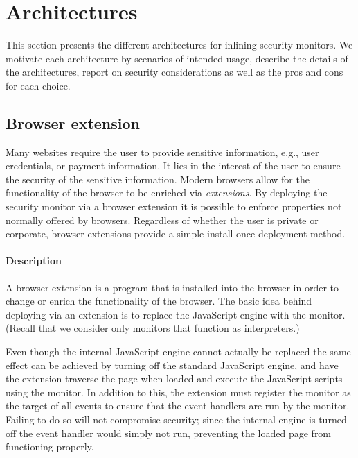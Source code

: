 \documentclass{llncs}
\begin{document}

\section{Architectures}
\label{sec:arch}

This section presents the different architectures for inlining
security monitors. We motivate each architecture by scenarios of
intended usage, describe the details of the architectures, report on
security considerations as well as the pros and cons for each choice.




\subsection{Browser extension}

Many websites require the user to provide sensitive information, e.g., user
credentials, or payment information. It lies in the interest of the user to
ensure the security of the sensitive information.  Modern browsers allow for
the functionality of the browser to be enriched via \emph{extensions}. By
deploying the security monitor via a browser extension it is possible to enforce
properties not normally offered by browsers.  Regardless of whether the user is
private or corporate, browser extensions provide a simple 
install-once deployment method.


\paragraph{Description}

A browser extension is a program that is installed into the browser in order to
change or enrich the functionality of the browser.  The basic idea behind
deploying via an extension is to replace the JavaScript engine with the monitor.
(Recall that we consider only monitors that function as interpreters.)

Even though the internal JavaScript engine cannot actually be replaced the same
effect can be achieved by turning off the standard JavaScript engine, and have
the extension traverse the page when loaded and execute the JavaScript scripts
using the monitor. 
In addition to this, the extension must register the monitor as the target of
all events to ensure that the event handlers are run by the monitor. Failing to
do so will not compromise security; since the internal engine is turned off
the event handler would simply not run, preventing the loaded page from functioning
properly.
\end{document}
